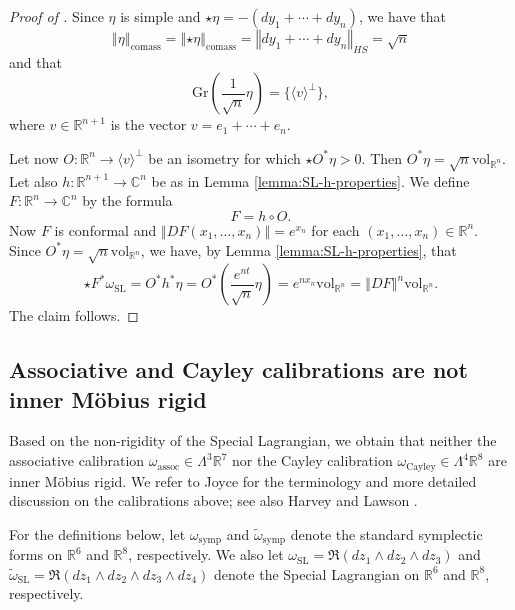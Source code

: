 \documentclass[a4paper,leqno,11pt]{amsart}
\numberwithin{equation}{section}
\theoremstyle{remark}
\theoremstyle{remark}
\newcommand{\R}{\mathbb{R}}
\newcommand{\norm}[1]{ \left\Vert #1 \right\Vert }	%
\newcommand{\vol}{\mathrm{vol}}
\newcommand{\C}{\mathbb{C}}
\newcommand{\comass}{\mathrm{comass}}
\newcommand{\symp}{\mathrm{symp}}
\newcommand{\Gr}{\mathrm{Gr}}
\newcommand{\SL}{\mathrm{SL}}
\newcommand{\assoc}{\mathrm{assoc}}
\newcommand{\Cayley}{\mathrm{Cayley}}
\begin{document}
\begin{proof}[Proof of ]
Since $\eta$ is simple and $\star \eta = - \left( dy_1 + \cdots + dy_n\right)$, we have that 
\[
\norm{\eta}_{\comass} 
= \norm{\star \eta}_\comass 
= \norm{dy_1 + \cdots + dy_n}_{HS} 
= \sqrt{n}
\]
and that 
\[
\Gr\left(\frac{1}{\sqrt{n}} \eta \right) = \{ \langle v \rangle^\bot \},
\] 
where $v\in \R^{n+1}$ is the vector $v = e_1+ \cdots + e_n$. 

Let now $O \colon \R^n \to \langle v \rangle^\bot$ be an isometry for which $\star O^*\eta>0$. Then $O^*\eta = \sqrt{n} \vol_{\R^n}$. Let also $h \colon \R^{n+1} \to \C^n$ be as in Lemma \ref{lemma:SL-h-properties}. We define $F \colon \R^n \to \C^n$ by the formula
\[
F = h \circ O.
\]
Now $F$ is conformal and $\norm{DF(x_1,\ldots, x_n)} = e^{x_n}$ for each $(x_1,\ldots, x_n)\in \R^n$. Since $O^*\eta = \sqrt{n} \vol_{\R^n}$, we have, by Lemma \ref{lemma:SL-h-properties}, that
\[
\star F^*\omega_\SL 
= O^* h^*\eta = O^* \left(\frac{e^{nt}}{\sqrt{n}} \eta \right) 
= e^{nx_n} \vol_{\R^n} 
= \norm{DF}^n \vol_{\R^n}.
\]
The claim follows. 
\end{proof}










\subsection{Associative and Cayley calibrations are not inner M\"obius rigid}
\label{sec:special-cases}


Based on the non-rigidity of the Special Lagrangian, we obtain that neither the associative calibration $\omega_\assoc \in \Lambda^3 \R^7$ nor the Cayley calibration $\omega_\Cayley \in \Lambda^4 \R^8$ are inner M\"obius rigid. We refer to Joyce \cite[Sections 12.2.1 and 12.4.2]{Joy:07} for the terminology and more detailed discussion on the calibrations above; see also Harvey and Lawson \cite[Section III.1]{Har:Law:82}.

For the definitions below, let $\omega_{\symp}$ and $\widetilde{\omega}_{\symp}$ denote the standard symplectic forms on $\R^6$ and $\R^8$, respectively. We also let $\omega_{\SL} = \Re( dz_1 \wedge dz_2 \wedge dz_3 )$ and $\widetilde{\omega}_{\SL} = \Re( dz_1 \wedge dz_2 \wedge dz_3 \wedge dz_4 )$ denote the Special Lagrangian on $\R^6$ and $\R^8$, respectively.
\end{document}
